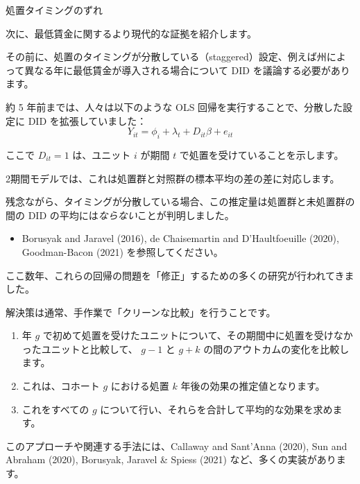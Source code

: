 \documentclass[11pt,handout]{beamer}
\newenvironment{wideitemize}{\itemize\addtolength{\itemsep}{10pt}}{\enditemize}
\begin{document}
\begin{frame}{処置タイミングのずれ}
	\begin{wideitemize}
		\item
		次に、最低賃金に関するより現代的な証拠を紹介します。
		
		\item
		その前に、処置のタイミングが分散している（staggered）設定、例えば州によって異なる年に最低賃金が導入される場合について DID を議論する必要があります。
		
		\pause
		\item
		約 5 年前までは、人々は以下のような OLS 回帰を実行することで、分散した設定に DID を拡張していました：
		$$Y_{it} = \phi_i + \lambda_t + D_{it} \beta + e_{it}$$
		
		\noindent ここで $D_{it} = 1$ は、ユニット $i$ が期間 $t$ で処置を受けていることを示します。
		
		\pause
		\item
		2期間モデルでは、これは処置群と対照群の標本平均の差の差に対応します。
		
		\pause
		\item 
		残念ながら、タイミングが分散している場合、この推定量は処置群と未処置群の間の DID の平均には\textit{ならない}ことが判明しました。
			\begin{itemize}
				\item 
				Borusyak and Jaravel (2016), de Chaisemartin and D'Haultfoeuille (2020), Goodman-Bacon (2021) を参照してください。
			\end{itemize}
	\end{wideitemize}
\end{frame}

\begin{frame}
	\begin{wideitemize}
		\item
		ここ数年、これらの回帰の問題を「修正」するための多くの研究が行われてきました。
		
		\item
		解決策は通常、手作業で「クリーンな比較」を行うことです。
		
		\pause
		\begin{enumerate}
			\item 
			年 $g$ で初めて処置を受けたユニットについて、その期間中に処置を受けなかったユニットと比較して、 $g-1$ と $g+k$ の間のアウトカムの変化を比較します。
			
			\pause
			\item
			これは、コホート $g$ における処置 $k$ 年後の効果の推定値となります。
			
			\pause
			\item
			これをすべての $g$ について行い、それらを合計して平均的な効果を求めます。
		\end{enumerate}

		\pause
		\item 
		このアプローチや関連する手法には、Callaway and Sant'Anna (2020), Sun and Abraham (2020), Borusyak, Jaravel \& Spiess (2021) など、多くの実装があります。	
	\end{wideitemize}
\end{frame}
\end{document}
